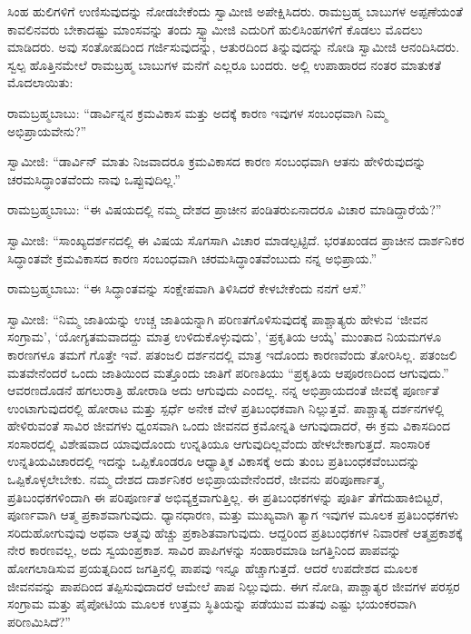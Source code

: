  ಸಿಂಹ ಹುಲಿಗಳಿಗೆ ಉಣಿಸುವುದನ್ನು ನೋಡಬೇಕೆಂದು ಸ್ವಾಮೀಜಿ ಅಪೇಕ್ಷಿಸಿದರು. ರಾಮಬ್ರಹ್ಮ ಬಾಬುಗಳ ಅಪ್ಪಣೆಯಂತೆ ಕಾವಲಿನವರು ಬೇಕಾದಷ್ಟು ಮಾಂಸವನ್ನು ತಂದು ಸ್ವ್ವಾಮೀಜಿ ಎದುರಿಗೆ ಹುಲಿಸಿಂಹಗಳಿಗೆ ಕೊಡಲು ಮೊದಲು ಮಾಡಿದರು. ಅವು ಸಂತೋಷದಿಂದ ಗರ್ಜಿಸುವುದನ್ನು, ಆತುರದಿಂದ ತಿನ್ನುವುದನ್ನು ನೋಡಿ ಸ್ವಾಮೀಜಿ ಆನಂದಿಸಿದರು. ಸ್ವಲ್ಪ ಹೊತ್ತಿನಮೇಲೆ ರಾಮಬ್ರಹ್ಮ ಬಾಬುಗಳ ಮನೆಗೆ ಎಲ್ಲರೂ ಬಂದರು. ಅಲ್ಲಿ ಉಪಾಹಾರದ ನಂತರ ಮಾತುಕತೆ ಮೊದಲಾಯಿತು: 

\newpage

 ರಾಮಬ್ರಹ್ಮಬಾಬು: “ಡಾರ್ವಿನ್ನನ ಕ್ರಮವಿಕಾಸ ಮತ್ತು ಅದಕ್ಕೆ ಕಾರಣ ಇವುಗಳ ಸಂಬಂಧವಾಗಿ ನಿಮ್ಮ ಅಭಿಪ್ರಾಯವೇನು?” 

 ಸ್ವಾಮೀಜಿ: “ಡಾರ್ವಿನ್ ಮಾತು ನಿಜವಾದರೂ ಕ್ರಮವಿಕಾಸದ ಕಾರಣ ಸಂಬಂಧವಾಗಿ ಆತನು ಹೇಳಿರುವುದನ್ನು ಚರಮಸಿದ್ಧಾಂತವೆಂದು ನಾವು ಒಪ್ಪುವುದಿಲ್ಲ.” 

 ರಾಮಬ್ರಹ್ಮಬಾಬು: “ಈ ವಿಷಯದಲ್ಲಿ ನಮ್ಮ ದೇಶದ ಪ್ರಾಚೀನ ಪಂಡಿತರು\break ಏನಾದರೂ ವಿಚಾರ ಮಾಡಿದ್ದಾರೆಯೆ?” 

 ಸ್ವಾಮೀಜಿ: “ಸಾಂಖ್ಯದರ್ಶನದಲ್ಲಿ ಈ ವಿಷಯ ಸೊಗಸಾಗಿ ವಿಚಾರ ಮಾಡಲ್ಪಟ್ಟಿದೆ. ಭರತಖಂಡದ ಪ್ರಾಚೀನ ದಾರ್ಶನಿಕರ ಸಿದ್ಧಾಂತವೇ ಕ್ರಮವಿಕಾಸದ ಕಾರಣ ಸಂಬಂಧವಾಗಿ ಚರಮಸಿದ್ಧಾಂತವೆಂಬುದು ನನ್ನ ಅಭಿಪ್ರಾಯ.” 

 ರಾಮಬ್ರಹ್ಮಬಾಬು: “ಈ ಸಿದ್ಧಾಂತವನ್ನು ಸಂಕ್ಷೇಪವಾಗಿ ತಿಳಿಸಿದರೆ ಕೇಳಬೇಕೆಂದು ನನಗೆ ಆಸೆ.” 

 ಸ್ವಾಮೀಜಿ: “ನಿಮ್ಮ ಜಾತಿಯನ್ನು ಉಚ್ಚ ಜಾತಿಯನ್ನಾಗಿ ಪರಿಣತಗೊಳಿಸುವುದಕ್ಕೆ ಪಾಶ್ಚಾತ್ಯರು ಹೇಳುವ ‘ಜೀವನ ಸಂಗ್ರಾಮ’, ‘ಯೋಗ್ಯತಮವಾದದ್ದು ಮಾತ್ರ ಉಳಿದುಕೊಳ್ಳುವುದು’, ‘ಪ್ರಕೃತಿಯ ಆಯ್ಕೆ’ ಮುಂತಾದ ನಿಯಮಗಳೂ ಕಾರಣಗಳೂ ತಮಗೆ ಗೊತ್ತೇ ಇವೆ. ಪತಂಜಲಿ ದರ್ಶನದಲ್ಲಿ ಮಾತ್ರ ಇದೊಂದು ಕಾರಣವೆಂದು ತೋರಿಸಿಲ್ಲ. ಪತಂಜಲಿ ಮತವೇನೆಂದರೆ ಒಂದು ಜಾತಿಯಿಂದ ಮತ್ತೊಂದು ಜಾತಿಗೆ ಪರಿಣತಿಯು “ಪ್ರಕೃತಿಯ ಆಪೂರಣದಿಂದ ಆಗುವುದು.” ಆವರಣದೊಡನೆ ಹಗಲುರಾತ್ರಿ ಹೋರಾಡಿ ಅದು ಆಗುವುದು ಎಂದಲ್ಲ. ನನ್ನ ಅಭಿಪ್ರಾಯದಂತೆ ಜೀವಕ್ಕೆ ಪೂರ್ಣತೆ ಉಂಟಾಗುವುದರಲ್ಲಿ ಹೋರಾಟ ಮತ್ತು ಸ್ಪರ್ಧೆ ಅನೇಕ ವೇಳೆ ಪ್ರತಿಬಂಧಕವಾಗಿ ನಿಲ್ಲುತ್ತವೆ. ಪಾಶ್ಚಾತ್ಯ ದರ್ಶನಗಳಲ್ಲಿ ಹೇಳಿರುವಂತೆ ಸಾವಿರ ಜೀವಗಳು ಧ್ವಂಸವಾಗಿ ಒಂದು ಜೀವನದ ಕ್ರಮೋನ್ನತಿ ಆಗುವುದಾದರೆ, ಈ ಕ್ರಮ ವಿಕಾಸದಿಂದ ಸಂಸಾರದಲ್ಲಿ ವಿಶೇಷವಾದ ಯಾವುದೊಂದು ಉನ್ನತಿಯೂ ಆಗುವುದಿಲ್ಲವೆಂದು ಹೇಳಬೇಕಾಗುತ್ತದೆ. ಸಾಂಸಾರಿಕ ಉನ್ನತಿಯ\break ವಿಚಾರದಲ್ಲಿ ಇದನ್ನು ಒಪ್ಪಿಕೊಂಡರೂ ಆಧ್ಯಾತ್ಮಿಕ ವಿಕಾಸಕ್ಕೆ ಅದು ತುಂಬ ಪ್ರತಿಬಂಧಕವೆಂಬುದನ್ನು ಒಪ್ಪಿಕೊಳ್ಳಲೇಬೇಕು. ನಮ್ಮ ದೇಶದ ದಾರ್ಶನಿಕರ ಅಭಿಪ್ರಾಯವೇನೆಂದರೆ, ಜೀವನು ಪರಿಪೂರ್ಣಾತ್ಮ, ಪ್ರತಿಬಂಧಕಗಳಿಂದಾಗಿ ಈ ಪರಿಪೂರ್ಣತೆ ಅಭಿವ್ಯಕ್ತವಾಗುತ್ತಿಲ್ಲ. ಈ ಪ್ರತಿಬಂಧಕಗಳನ್ನು ಪೂರ್ತಿ ತೆಗೆದುಹಾಕಿಬಿಟ್ಟರೆ, ಪೂರ್ಣವಾಗಿ ಆತ್ಮ ಪ್ರಕಾಶವಾಗುವುದು. ಧ್ಯಾನಧಾರಣ, ಮತ್ತು ಮುಖ್ಯವಾಗಿ ತ್ಯಾಗ ಇವುಗಳ ಮೂಲಕ ಪ್ರತಿಬಂಧಕಗಳು ಸರಿದುಹೋಗುವುವು ಅಥವಾ ಆತ್ಮವು ಹೆಚ್ಚು ಪ್ರಕಾಶಿತವಾಗುವುದು. ಆದ್ದರಿಂದ ಪ್ರತಿಬಂಧಕಗಳ ನಿವಾರಣೆ ಆತ್ಮಪ್ರಕಾಶಕ್ಕೆ ನೇರ ಕಾರಣವಲ್ಲ, ಅದು ಸ್ವಯಂಪ್ರಕಾಶ. ಸಾವಿರ ಪಾಪಿಗಳನ್ನು ಸಂಹಾರಮಾಡಿ ಜಗತ್ತಿನಿಂದ ಪಾಪವನ್ನು ಹೋಗಲಾಡಿಸುವ ಪ್ರಯತ್ನದಿಂದ ಜಗತ್ತಿನಲ್ಲಿ ಪಾಪವು ಇನ್ನೂ ಹೆಚ್ಚಾಗುತ್ತದೆ. ಆದರೆ ಉಪದೇಶದ ಮೂಲಕ ಜೀವನವನ್ನು ಪಾಪದಿಂದ ತಪ್ಪಿಸುವುದಾದರೆ ಆಮೇಲೆ ಪಾಪ ನಿಲ್ಲುವುದು. ಈಗ ನೋಡಿ, ಪಾಶ್ಚಾತ್ಯರ ಜೀವಗಳ ಪರಸ್ಪರ ಸಂಗ್ರಾಮ ಮತ್ತು ಪೈಪೋಟಿಯ ಮೂಲಕ ಉತ್ತಮ ಸ್ಥಿತಿಯನ್ನು ಪಡೆಯುವ ಮತವು ಎಷ್ಟು ಭಯಂಕರವಾಗಿ ಪರಿಣಮಿಸಿದೆ?” 

